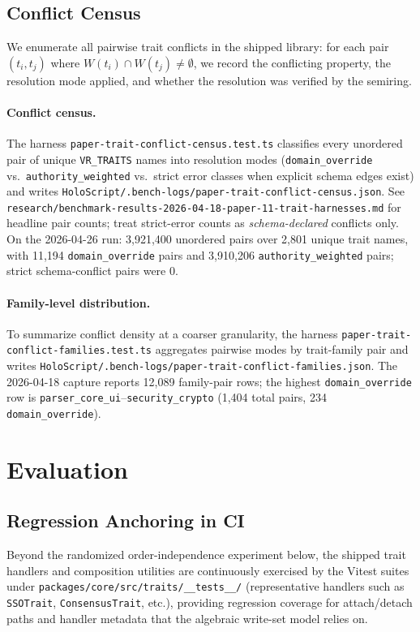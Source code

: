 \documentclass[sigconf,nonacm]{acmart}
\begin{document}
\subsection{Conflict Census}

We enumerate all pairwise trait conflicts in the shipped
library: for each pair $(t_i, t_j)$ where
$W(t_i) \cap W(t_j) \neq \emptyset$, we record the
conflicting property, the resolution mode applied, and
whether the resolution was verified by the semiring.

\paragraph{Conflict census.}
The harness \texttt{paper-trait-conflict-census.test.ts} classifies every
unordered pair of unique \texttt{VR\_TRAITS} names into resolution modes
(\texttt{domain\_override} vs.\ \texttt{authority\_weighted} vs.\ strict
error classes when explicit schema edges exist) and writes
\texttt{HoloScript/.bench-logs/paper-trait-conflict-census.json}.
See \texttt{research/benchmark-results-2026-04-18-paper-11-trait-harnesses.md}
for headline pair counts; treat strict-error counts as \emph{schema-declared}
conflicts only. On the 2026-04-26 run: 3{,}921{,}400 unordered pairs over
2{,}801 unique trait names, with 11{,}194 \texttt{domain\_override} pairs and
3{,}910{,}206 \texttt{authority\_weighted} pairs; strict schema-conflict pairs
were 0.

\paragraph{Family-level distribution.}
To summarize conflict density at a coarser granularity, the harness
\texttt{paper-trait-conflict-families.test.ts} aggregates pairwise modes by
trait-family pair and writes
\texttt{HoloScript/.bench-logs/paper-trait-conflict-families.json}. The
2026-04-18 capture reports 12,089 family-pair rows; the highest
\texttt{domain\_override} row is
\texttt{parser\_core\_ui}--\texttt{security\_crypto}
(1,404 total pairs, 234 \texttt{domain\_override}).

\section{Evaluation}
\label{sec:eval}

\subsection{Regression Anchoring in CI}
Beyond the randomized order-independence experiment below, the shipped trait
handlers and composition utilities are continuously exercised by the Vitest
suites under \texttt{packages/core/src/traits/\_\_tests\_\_/} (representative
handlers such as \texttt{SSOTrait}, \texttt{ConsensusTrait}, etc.), providing
regression coverage for attach/detach paths and handler metadata that the
algebraic write-set model relies on.
\end{document}
